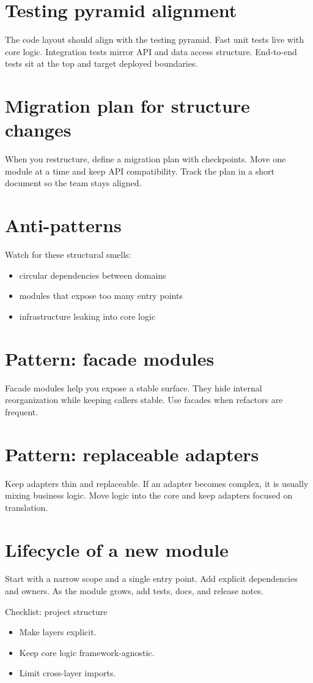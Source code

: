 \section{Testing pyramid alignment}
The code layout should align with the testing pyramid.
Fast unit tests live with core logic.
Integration tests mirror API and data access structure.
End-to-end tests sit at the top and target deployed boundaries.

\section{Migration plan for structure changes}
When you restructure, define a migration plan with checkpoints.
Move one module at a time and keep API compatibility.
Track the plan in a short document so the team stays aligned.

\section{Anti-patterns}
Watch for these structural smells:
\begin{itemize}[nosep]
  \item circular dependencies between domains
  \item modules that expose too many entry points
  \item infrastructure leaking into core logic
\end{itemize}

\section{Pattern: facade modules}
Facade modules help you expose a stable surface.
They hide internal reorganization while keeping callers stable.
Use facades when refactors are frequent.

\section{Pattern: replaceable adapters}
Keep adapters thin and replaceable.
If an adapter becomes complex, it is usually mixing business logic.
Move logic into the core and keep adapters focused on translation.

\section{Lifecycle of a new module}
Start with a narrow scope and a single entry point.
Add explicit dependencies and owners.
As the module grows, add tests, docs, and release notes.

\begin{checklistbox}{Checklist: project structure}
\begin{itemize}[nosep]
  \item Make layers explicit.
  \item Keep core logic framework-agnostic.
  \item Limit cross-layer imports.
\end{itemize}
\end{checklistbox}
